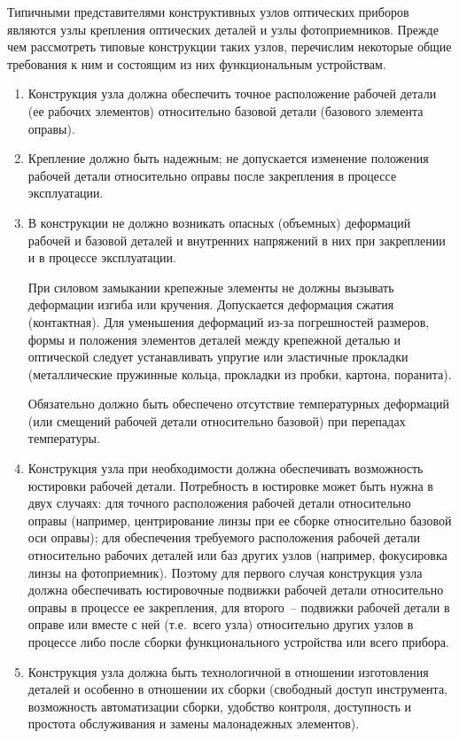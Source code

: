 Типичными представителями конструктивных узлов оптических приборов являются узлы крепления оптических деталей и узлы фотоприемников. Прежде чем рассмотреть типовые конструкции таких узлов, перечислим некоторые общие требования к ним и состоящим из них функциональным устройствам.

\begin{enumerate}
	
	\item Конструкция узла должна обеспечить точное расположение рабочей детали (ее рабочих элементов) относительно базовой детали (базового элемента оправы).
	
	\item Крепление должно быть надежным; не допускается изменение положения рабочей детали относительно оправы после закрепления в процессе эксплуатации.
	
	\item В конструкции не должно возникать опасных (объемных) деформаций рабочей и базовой деталей и внутренних напряжений в них при закреплении и в процессе эксплуатации.
	
	При силовом замыкании крепежные элементы не должны вызывать деформации изгиба или кручения. Допускается деформация сжатия (контактная). Для уменьшения деформаций из-за погрешностей размеров, формы и положения элементов деталей между крепежной деталью и оптической следует устанавливать упругие или эластичные прокладки (металлические пружинные кольца, прокладки из пробки, картона, поранита).
	
	Обязательно должно быть обеспечено отсутствие температурных деформаций (или смещений рабочей детали относительно базовой) при перепадах температуры.
	\item Конструкция узла при необходимости должна обеспечивать возможность юстировки рабочей детали. Потребность в юстировке может быть нужна в двух случаях: для точного расположения рабочей детали относительно оправы (например, центрирование линзы при ее сборке относительно базовой оси оправы); для обеспечения требуемого расположения рабочей детали относительно рабочих деталей или баз других узлов (например, фокусировка линзы на фотоприемник). Поэтому для первого случая конструкция узла должна обеспечивать юстировочные подвижки рабочей детали относительно оправы в процессе ее закрепления, для второго~-- подвижки рабочей детали в оправе или вместе с ней (т.е.~всего узла) относительно других узлов в процессе либо после сборки функционального устройства или всего прибора.
	
	\item Конструкция узла должна быть технологичной в отношении изготовления деталей и особенно в отношении их сборки (свободный доступ инструмента, возможность автоматизации сборки, удобство контроля, доступность и простота обслуживания и замены малонадежных элементов).
	

\end{enumerate}
